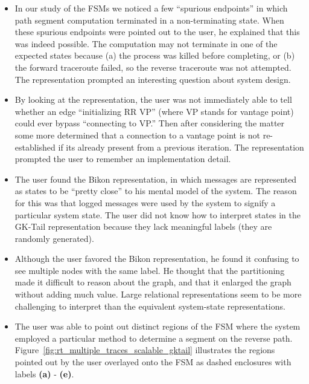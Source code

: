 
\begin{itemize}

\item In our study of the FSMs we noticed a few ``spurious endpoints''
  in which path segment computation terminated in a non-terminating
  state. When these spurious endpoints were pointed out to the user,
  he explained that this was indeed possible. The computation may not
  terminate in one of the expected states because (a) the process was
  killed before completing, or (b) the forward traceroute failed, so
  the reverse traceroute was not attempted. The representation
  prompted an interesting question about system design.

\item By looking at the representation, the user was not immediately
  able to tell whether an edge ``initializing RR VP'' (where VP stands
  for vantage point) could ever bypass ``connecting to VP.''  Then
  after considering the matter some more determined that a connection
  to a vantage point is not re-established if its already present from
  a previous iteration. The representation prompted the user to
  remember an implementation detail.

\item The user found the Bikon representation, in which messages are
  represented as states to be ``pretty close'' to his mental model of
  the system. The reason for this was that logged messages were used
  by the system to signify a particular system state. The user did not
  know how to interpret states in the GK-Tail
  representation because they lack meaningful labels (they are
  randomly generated).

\item Although the user favored the Bikon representation, he found it
  confusing to see multiple nodes with the same label. He thought that
  the partitioning made it difficult to reason about the graph, and
  that it enlarged the graph without adding much value. Large
  relational representations seem to be more challenging to interpret
  than the equivalent system-state representations.

\item The user was able to point out distinct regions of the FSM where
  the system employed a particular method to determine a
  segment on the reverse path.
  Figure~\ref{fig:rt_multiple_traces_scalable_gktail}
  illustrates the regions pointed out by the user overlayed onto the
  FSM as dashed enclosures with labels \textbf{(a)} - \textbf{(e)}.


\end{itemize}
